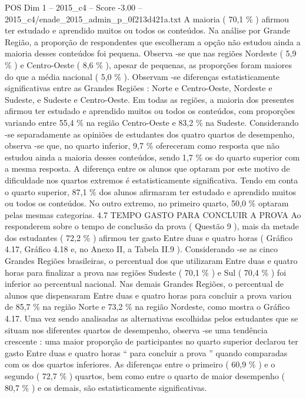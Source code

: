 \begin{textsample}{POS Dim 1 – 2015\_c4 – Score -3.00 – 2015\_c4/enade\_2015\_admin\_p\_0f213d421a.txt}
A maioria ( 70,1 \% ) afirmou ter estudado e aprendido muitos ou todos os conteúdos.
Na análise por Grande Região, a proporção de respondentes que escolheram a opção não estudou ainda a maioria desses conteúdos foi pequena.
Observa -se que nas regiões Nordeste ( 5,9 \% ) e Centro-Oeste ( 8,6 \% ), apesar de pequenas, as proporções foram maiores do que a média nacional ( 5,0 \% ).
Observam -se diferenças estatisticamente significativas entre as Grandes Regiões : Norte e Centro-Oeste, Nordeste e Sudeste, e Sudeste e Centro-Oeste.
Em todas as regiões, a maioria dos presentes afirmou ter estudado e aprendido muitos ou todos os conteúdos, com proporções variando entre 55,4 \% na região Centro-Oeste e 83,2 \% na Sudeste.
Considerando -se separadamente as opiniões de estudantes dos quatro quartos de desempenho, observa -se que, no quarto inferior, 9,7 \% ofereceram como resposta que não estudou ainda a maioria desses conteúdos, sendo 1,7 \% os do quarto superior com a mesma resposta.
A diferença entre os alunos que optaram por este motivo de dificuldade nos quartos extremos é estatisticamente significativa.
Tendo em conta o quarto superior, 87,1 \% dos alunos afirmaram ter estudado e aprendido muitos ou todos os conteúdos.
No outro extremo, no primeiro quarto, 50,0 \% optaram pelas mesmas categorias. 4.7 TEMPO GASTO PARA CONCLUIR A PROVA Ao responderem sobre o tempo de conclusão da prova ( Questão 9 ), mais da metade dos estudantes ( 72,2 \% ) afirmou ter gasto Entre duas e quatro horas ( Gráfico 4.17, Gráfico 4.18 e, no Anexo II, a Tabela II.9 ).
Considerando -se as cinco Grandes Regiões brasileiras, o percentual dos que utilizaram Entre duas e quatro horas para finalizar a prova nas regiões Sudeste ( 70,1 \% ) e Sul ( 70,4 \% ) foi inferior ao percentual nacional.
Nas demais Grandes Regiões, o percentual de alunos que dispensaram Entre duas e quatro horas para concluir a prova variou de 85,7 \% na região Norte e 73,2 \% na região Nordeste, como mostra o Gráfico 4.17.
Uma vez sendo analisadas as alternativas escolhidas pelos estudantes que se situam nos diferentes quartos de desempenho, observa -se uma tendência crescente : uma maior proporção de participantes no quarto superior declarou ter gasto Entre duas e quatro horas “ para concluir a prova ” quando comparadas com os dos quartos inferiores.
As diferenças entre o primeiro ( 60,9 \% ) e o segundo ( 72,7 \% ) quartos, bem como entre o quarto de maior desempenho ( 80,7 \% ) e os demais, são estatisticamente significativas.

\end{textsample}
